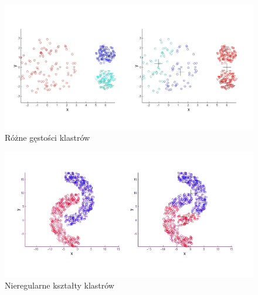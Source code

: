 \begin{figure}
\includegraphics[width=\textwidth]{kmeans_density}
\caption{Różne gęstości klastrów \cite{Luk}}
\end{figure}

\begin{figure}
\includegraphics[width=\textwidth]{kmeans_irregular}
\caption{Nieregularne kształty klastrów \cite{Luk}} 
\end{figure}